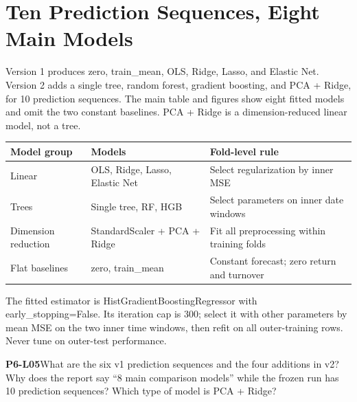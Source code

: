 \clearpage\section{Ten Prediction Sequences, Eight Main Models}
\begin{strand}
Version 1 produces zero, train\_mean, OLS, Ridge, Lasso, and Elastic Net. Version 2 adds a single tree, random forest, gradient boosting, and PCA + Ridge, for 10 prediction sequences. The main table and figures show eight fitted models and omit the two constant baselines. PCA + Ridge is a dimension-reduced linear model, not a tree.
\end{strand}
\begin{center}\small
\begin{tabular}{lll}
\toprule
Model group & Models & Fold-level rule\\
\midrule
Linear & OLS, Ridge, Lasso, Elastic Net & Select regularization by inner MSE\\
Trees & Single tree, RF, HGB & Select parameters on inner date windows\\
Dimension reduction & StandardScaler + PCA + Ridge & Fit all preprocessing within training folds\\
Flat baselines & zero, train\_mean & Constant forecast; zero return and turnover\\
\bottomrule
\end{tabular}
\end{center}
The fitted estimator is HistGradientBoostingRegressor with early\_stopping=False. Its iteration cap is 300; select it with other parameters by mean MSE on the two inner time windows, then refit on all outer-training rows. Never tune on outer-test performance.
\begin{yourturn}\textbf{P6-L05}\quad What are the six v1 prediction sequences and the four additions in v2? Why does the report say “8 main comparison models” while the frozen run has 10 prediction sequences? Which type of model is PCA + Ridge?\workspace[4]\end{yourturn}

